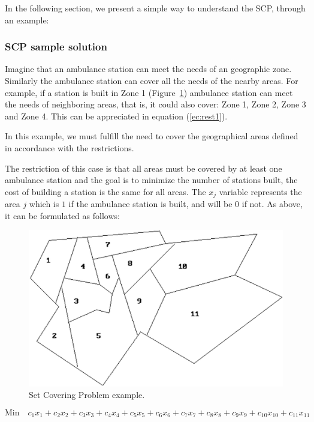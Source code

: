 In the following section, we present a simple way to understand the SCP, through an example:\\

\subsubsection{SCP sample solution}
Imagine that an ambulance station can meet the needs of an geographic zone. Similarly the ambulance station can cover all the needs of the nearby areas. For example, if a station is built in Zone 1 (Figure~\ref{fig:SetCovering}) ambulance station can meet the needs of neighboring areas, that is, it could also cover: Zone 1, Zone 2, Zone 3 and Zone 4.  This can be appreciated in equation (\ref{ec:rest1}).

In this example, we must fulfill the need to cover the geographical areas defined in accordance with the restrictions.

The restriction of this case is that all areas must be covered by at least one ambulance station and the goal is to minimize the number of stations built, the cost of building a station is the same for all areas. The $x_j$ variable represents the area $j$ which is $1$ if the ambulance station is built, and will be $0$ if not. As above, it can be formulated as follows:

\squeezeup
\begin{figure}[!http]
	\begin{center}
		\includegraphics[width=0.8\linewidth]{Introduccion/imagenes/SetCovering.png}
		\caption{Set Covering Problem example.}\label{fig:SetCovering}
	\end{center}
\end{figure}
\squeezeup


\scriptsize
\begin{equation} \label{ec:SetCoveringExample} 
\mbox{Min} \quad c_{1}x_{1} + c_{2}x_{2} + c_{3}x_{3} + c_{4}x_{4} + c_{5}x_{5} + c_{6}x_{6} + c_{7}x_{7} + c_{8}x_{8} + c_{9}x_{9} + c_{10}x_{10} + c_{11}x_{11}
\end{equation}

